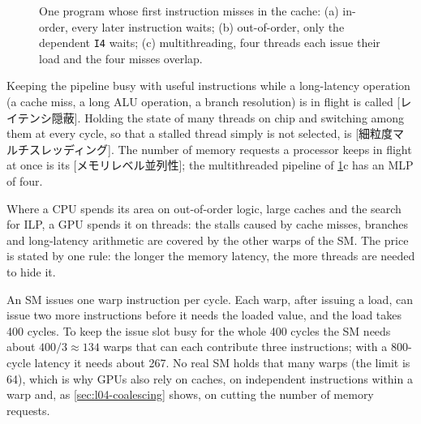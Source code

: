 \documentclass[../main.tex]{subfiles}
\begin{document}
\begin{figure}[htbp]
  \centering
  
  \caption{One program whose first instruction misses in the cache:
    (a) in-order, every later instruction waits; (b) out-of-order, only
    the dependent \texttt{I4} waits; (c) multithreading, four threads
    each issue their load and the four misses overlap.}
  \label{fig:l04-latency-hiding}
\end{figure}

\begin{definition}
  \label{def:l04-latency-hiding}
  Keeping the pipeline busy with useful instructions while a
  long-latency operation (a cache miss, a long ALU operation, a branch
  resolution) is in flight is called
  [レイテンシ隠蔽].  Holding the state of many
  threads on chip and switching among them at every cycle, so that a
  stalled thread simply is not selected, is
  [細粒度マルチスレッディング].  The number of memory requests a processor keeps in flight
  at once is its [メモリレベル並列性];
  the multithreaded pipeline of \cref{fig:l04-latency-hiding}c has an
  MLP of four.
\end{definition}

Where a CPU spends its area on out-of-order logic, large caches and the
search for ILP, a GPU spends it on threads: the stalls caused by cache
misses, branches and long-latency arithmetic are covered by the other
warps of the SM.  The price is stated by one rule: the longer the memory
latency, the more threads are needed to hide it.

\begin{example}
  \label{ex:l04-threads-needed}
  An SM issues one warp instruction per cycle.  Each warp, after issuing
  a load, can issue two more instructions before it needs the loaded
  value, and the load takes \num{400} cycles.  To keep the issue slot
  busy for the whole \num{400} cycles the SM needs about
  $400 / 3 \approx 134$ warps that can each contribute three
  instructions; with a \num{800}-cycle latency it needs about
  \num{267}.  No real SM holds that many warps (the limit is
  \num{64}), which is why GPUs also rely on caches, on independent
  instructions within a warp and, as \cref{sec:l04-coalescing} shows,
  on cutting the number of memory requests.
\end{example}
\end{document}
